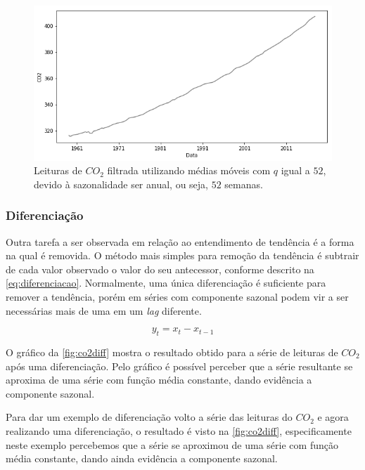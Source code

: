 \documentclass[
    12pt,
    oneside,
    a4paper,
    english,
    brazil
]{abntex2}
\begin{document}
\begin{figure}
    \centering
    \caption{Leituras de $CO_2$ filtrada utilizando médias móveis com $q$ igual
        a $52$, devido à sazonalidade ser anual, ou seja, $52$
        semanas.}\label{fig:co2filtrado}
    \includegraphics[width=.6\linewidth]{images/co2_filtered.png}
\end{figure}

\subsubsection{Diferenciação}\label{sec:diff}

Outra tarefa a ser observada em relação  ao entendimento de tendência é a forma
na qual é removida. O método mais  simples para remoção da tendência é subtrair
de  cada valor  observado  o  valor do  seu  antecessor,  conforme descrito  na
\autoref{eq:diferenciacao}. Normalmente,  uma única diferenciação  é suficiente
para remover  a tendência, porém em  séries com componente sazonal  podem vir a
ser necessárias mais de uma em um \textit{lag} diferente.

\begin{equation}
    \label{eq:diferenciacao}
    y_t = x_t - x_{t-1}
\end{equation}


O gráfico  da \autoref{fig:co2diff} mostra o  resultado obtido para a  série de
leituras de $CO_2$ após uma diferenciação.
Pelo gráfico  é possível  perceber que  a série resultante  se aproxima  de uma
série com função média constante, dando evidência a componente sazonal.

Para  dar  um   exemplo  de  diferenciação  volto  a  série   das  leituras  do
$CO_2$  e  agora   realizando  uma  diferenciação,  o  resultado   é  visto  na
\autoref{fig:co2diff}, especificamente neste exemplo  percebemos que a série se
aproximou de  uma série  com função  média constante,  dando ainda  evidência a
componente sazonal.
\end{document}
